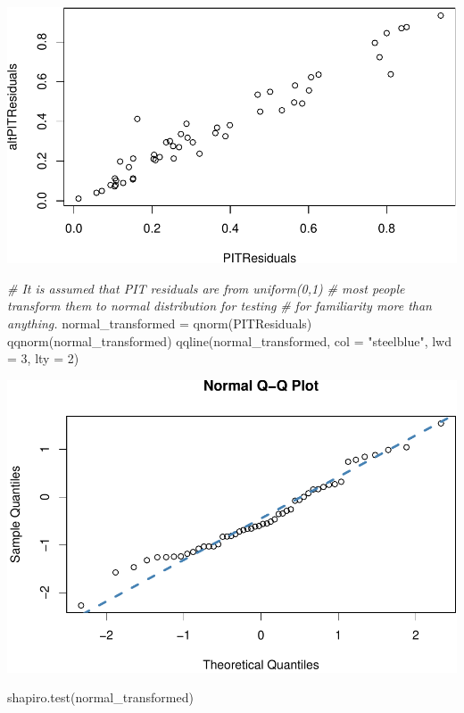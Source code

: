 \documentclass[
]{book}
\newenvironment{Shaded}{\begin{snugshade}}{\end{snugshade}}
\newcommand{\AttributeTok}[1]{\textcolor[rgb]{0.77,0.63,0.00}{#1}}
\newcommand{\CommentTok}[1]{\textcolor[rgb]{0.56,0.35,0.01}{\textit{#1}}}
\newcommand{\DecValTok}[1]{\textcolor[rgb]{0.00,0.00,0.81}{#1}}
\newcommand{\FunctionTok}[1]{\textcolor[rgb]{0.00,0.00,0.00}{#1}}
\newcommand{\NormalTok}[1]{#1}
\newcommand{\OtherTok}[1]{\textcolor[rgb]{0.56,0.35,0.01}{#1}}
\newcommand{\StringTok}[1]{\textcolor[rgb]{0.31,0.60,0.02}{#1}}
\begin{document}
\includegraphics{_main_files/figure-latex/illustrate_PIT-1.pdf}

\begin{Shaded}
\begin{Highlighting}[]
\CommentTok{\# It is assumed that PIT residuals are from uniform(0,1)}
\CommentTok{\# most people transform them to normal distribution for testing}
\CommentTok{\# for familiarity more than anything.}
\NormalTok{normal\_transformed }\OtherTok{=} \FunctionTok{qnorm}\NormalTok{(PITResiduals)}
\FunctionTok{qqnorm}\NormalTok{(normal\_transformed)}
\FunctionTok{qqline}\NormalTok{(normal\_transformed, }\AttributeTok{col =} \StringTok{"steelblue"}\NormalTok{, }\AttributeTok{lwd =} \DecValTok{3}\NormalTok{, }\AttributeTok{lty =} \DecValTok{2}\NormalTok{)}
\end{Highlighting}
\end{Shaded}

\includegraphics{_main_files/figure-latex/illustrate_PIT-2.pdf}

\begin{Shaded}
\begin{Highlighting}[]
\FunctionTok{shapiro.test}\NormalTok{(normal\_transformed)}
\end{Highlighting}
\end{Shaded}
\end{document}

